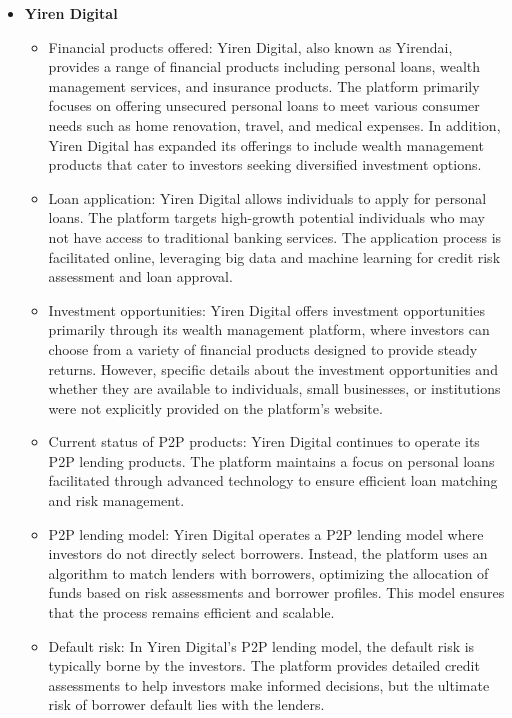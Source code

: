 \documentclass{article}
\begin{document}
\begin{itemize}
    \item \textbf{Yiren Digital}
        \begin{itemize}
            \item Financial products offered: Yiren Digital, also known as Yirendai, provides a range of financial products including personal loans, wealth management services, and insurance products. The platform primarily focuses on offering unsecured personal loans to meet various consumer needs such as home renovation, travel, and medical expenses. In addition, Yiren Digital has expanded its offerings to include wealth management products that cater to investors seeking diversified investment options.
            \item Loan application: Yiren Digital allows individuals to apply for personal loans. The platform targets high-growth potential individuals who may not have access to traditional banking services. The application process is facilitated online, leveraging big data and machine learning for credit risk assessment and loan approval.
            \item Investment opportunities: Yiren Digital offers investment opportunities primarily through its wealth management platform, where investors can choose from a variety of financial products designed to provide steady returns. However, specific details about the investment opportunities and whether they are available to individuals, small businesses, or institutions were not explicitly provided on the platform's website.
            \item Current status of P2P products: Yiren Digital continues to operate its P2P lending products. The platform maintains a focus on personal loans facilitated through advanced technology to ensure efficient loan matching and risk management.
            \item P2P lending model: Yiren Digital operates a P2P lending model where investors do not directly select borrowers. Instead, the platform uses an algorithm to match lenders with borrowers, optimizing the allocation of funds based on risk assessments and borrower profiles. This model ensures that the process remains efficient and scalable.
            \item Default risk: In Yiren Digital’s P2P lending model, the default risk is typically borne by the investors. The platform provides detailed credit assessments to help investors make informed decisions, but the ultimate risk of borrower default lies with the lenders.
        \end{itemize}  


\end{itemize}
\end{document}
